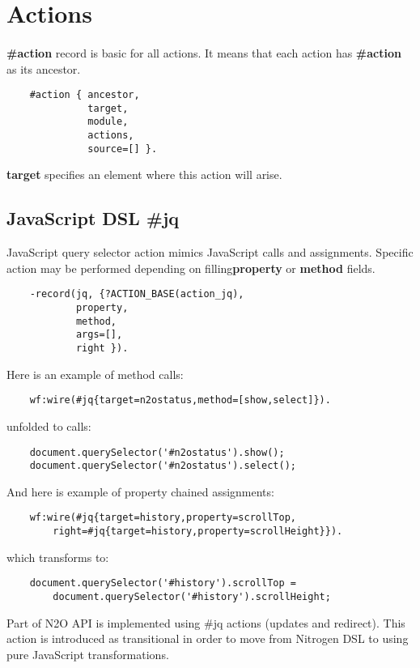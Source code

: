 \section{Actions}

\paragraph{}
{\bf \#action} record is basic for all actions. It means that each action
has {\bf \#action} as its ancestor.

\vspace{1\baselineskip}
\begin{lstlisting}
    #action { ancestor,
              target,
              module,
              actions,
              source=[] }.
\end{lstlisting}
\vspace{1\baselineskip}

{\bf target} specifies an element where this action will arise.

\subsection{JavaScript DSL {\bf \#jq}}
JavaScript query selector action mimics JavaScript calls and assignments.
Specific action may be performed depending on filling{\bf property} or {\bf method} fields.

\vspace{1\baselineskip}
\begin{lstlisting}
    -record(jq, {?ACTION_BASE(action_jq),
            property,
            method,
            args=[],
            right }).
\end{lstlisting}
\vspace{1\baselineskip}

Here is an example of method calls:
\begin{lstlisting}
    wf:wire(#jq{target=n2ostatus,method=[show,select]}).
\end{lstlisting}
unfolded to calls:
\begin{lstlisting}
    document.querySelector('#n2ostatus').show();
    document.querySelector('#n2ostatus').select();
\end{lstlisting}
\vspace{1\baselineskip}

And here is example of property chained assignments:
\begin{lstlisting}
    wf:wire(#jq{target=history,property=scrollTop,
        right=#jq{target=history,property=scrollHeight}}).
\end{lstlisting}
which transforms to:
\begin{lstlisting}
    document.querySelector('#history').scrollTop =
        document.querySelector('#history').scrollHeight;
\end{lstlisting}
\vspace{1\baselineskip}
Part of N2O API is implemented using \#jq actions (updates and redirect).
This action is introduced as transitional in order to move
from Nitrogen DSL to using pure JavaScript transformations.


